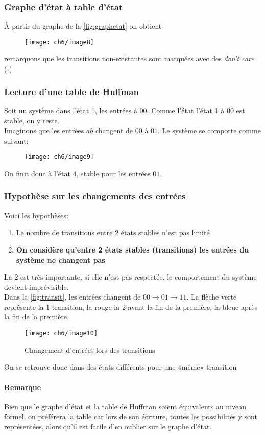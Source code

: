 \subsubsection{Graphe d'état à table d'état}
À partir du graphe de la \autoref{fig:graphetat}
on obtient
\begin{figure}[H]
	\centering
	\texttt{[image: ch6/image8]}
\end{figure}
remarquons que les transitions non-existantes sont marquées avec des \textit{don't care} (-)
\subsubsection{Lecture d'une table de Huffman}
Soit un système dans l'état 1, les entrées à $00$. Comme l'état l'état 1 à $00$ est stable, on y reste.\\
Imaginons que les entrées $ab$ changent de $00$ à $01$. Le système se comporte comme suivant:
\begin{figure}[H]
	\centering
	\texttt{[image: ch6/image9]}
\end{figure}
On finit donc à l'état 4, stable pour les entrées $01$.
\subsubsection{Hypothèse sur les changements des entrées}
Voici les hypothèses:
\begin{enumerate}
	\item Le nombre de transitions entre 2 états stables n'est pas limité
	\item \textbf{On considère qu'entre 2 états stables (transitions) les entrées du système ne changent pas}
\end{enumerate}
La 2 est très importante, si elle n'est pas respectée, le comportement du système devient imprévisible.\\
Dans la \autoref{fig:transit}, les entrées changent de $00\rightarrow 01\rightarrow 11$. La flèche verte représente la 1 transition, la rouge la 2 avant la fin de la première, la bleue après la fin de la première.
\begin{figure}[H]
	\centering
	\texttt{[image: ch6/image10]}
	\caption{Changement d'entrées lors des transitions}
	\label{fig:transit}
\end{figure}
On se retrouve donc dans des états différents pour une «même» transition
\paragraph{Remarque} Bien que le graphe d'état et la table de Huffman soient équivalents au niveau formel, on préférera la table car lors de son écriture, toutes les possibilités y sont représentées, alors qu'il est facile d'en oublier sur le graphe d'état.